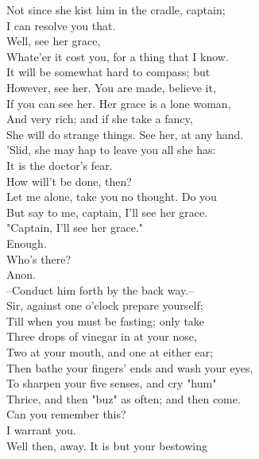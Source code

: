 \documentclass{memoir}
\begin{document}
\begin{drama*}
\subtlespeaks  Not since she kist him in the cradle, captain;\\
 I can resolve you that.\\
\facespeaks {} Well, see her grace,\\
 Whate'er it cost you, for a thing that I know.\\
 It will be somewhat hard to compass; but\\
 However, see her. You are made, believe it,\\
 If you can see her. Her grace is a lone woman,\\
 And very rich; and if she take a fancy,\\
 She will do strange things. See her, at any hand.\\
 'Slid, she may hap to leave you all she has:\\
 It is the doctor's fear.\\
\dapperspeaks {} How will't be done, then?\\
\facespeaks  Let me alone, take you no thought. Do you\\
 But say to me, captain, I'll see her grace.\\
\dapperspeaks  "Captain, I'll see her grace."\\
\facespeaks {} Enough.\\
\subtlespeaks {} Who's there?\\
 Anon.\\
 --Conduct him forth by the back way.--\\
 Sir, against one o'clock prepare yourself;\\
 Till when you must be fasting; only take\\
 Three drops of vinegar in at your nose,\\
 Two at your mouth, and one at either ear;\\
 Then bathe your fingers' ends and wash your eyes,\\
 To sharpen your five senses, and cry "hum"\\
 Thrice, and then "buz" as often; and then come.\\
\facespeaks  Can you remember this?\\
\dapperspeaks {} I warrant you.\\
\facespeaks  Well then, away. It is but your bestowing\\

\end{drama*}
\end{document}
